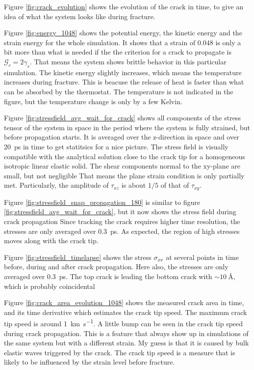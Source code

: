 Figure \ref{fig:crack_evolution} shows the evolution of the crack in time, to give an idea of what the system looks like during fracture. 

Figure \ref{fig:energy_1048} shows the potential energy, the kinetic energy and the strain energy for the whole simulation. It shows that a strain of 0.048 is only a bit more than what is needed if the the criterion for a crack to propagate is $\mathcal{G}_c = 2\gamma_s$. That means the system shows brittle behavior in this particular simulation. The kinetic energy slightly increases, which means the temperature increases during fracture. This is beacuse the release of heat is faster than what can be absorbed by the thermostat. The temperature is not indicated in the figure, but the temperature change is only by a few Kelvin. 

Figure \ref{fig:stressfield_avg_wait_for_crack} shows all components of the stress tensor of the system in space in the period where the system is fully strained, but before propagation starts. It is averaged over the z-direction in space and over \SI{20}{\pico\second} in time to get statitsics for a nice picture. The stress field is visually compatible with the analytical solution close to the crack tip for a homogeneous isotropic linear elastic solid. The shear components normal to the xy-plane are small, but not negligible That means the plane strain condition is only partially met. Particularly, the amplitude of $\tau_{xz}$ is about $1/5$ of that of $\tau_{xy}$. 


Figure \ref{fig:stressfield_snap_propagation_180} is similar to figure \ref{fig:stressfield_avg_wait_for_crack}, but it now shows the stress field during crack propagation Since tracking the crack requires higher time resolution, the stresses are only averaged over \SI{0.3}{\pico\second}. As expected, the region of high stresses moves along with the crack tip.

Figure \ref{fig:stressfield_timelapse} shows the stress $\sigma_{xx}$ at several points in time before, during and after crack propagation. Here also, the stresses are only averaged over \SI{0.3}{\pico\second}. The top crack is leading the bottom crack with $\sim \SI{10}{\angstrom}$, which is probably coincidental

Figure \ref{fig:crack_area_evolution_1048} shows the measured crack area in time, and its time derivative which estimates the crack tip speed. The maximum crack tip speed is around \SI{1}{\kilo\meter\per\second}. A little bump can be seen in the crack tip speed during crack propagation. This is a feature that always show up in simulations of the same system but with a different strain. My guess is that it is caused by bulk elastic waves triggered by the crack. The crack tip speed is a measure that is likely to be influenced by the strain level before fracture. 

